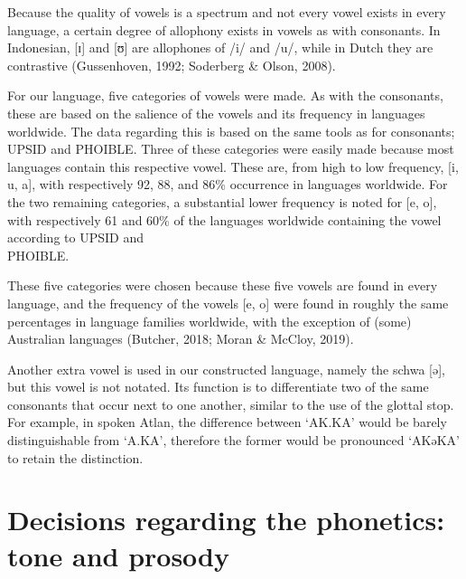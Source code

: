 Because the quality of vowels is a spectrum and not every vowel exists in every language, a certain degree of allophony exists in vowels as with consonants. In Indonesian, [ɪ] and [ʊ] are allophones of /i/ and /u/, while in Dutch they are contrastive (Gussenhoven, 1992; Soderberg \& Olson, 2008). 

For our language, five categories of vowels were made. As with the consonants, these are based on the salience of the vowels and its frequency in languages worldwide. The data regarding this is based on the same tools as for consonants; UPSID and PHOIBLE. Three of these categories were easily made because most languages contain this respective vowel. These are, from high to low frequency, [i, u, a], with respectively 92, 88, and 86\% occurrence in languages worldwide. For the two remaining categories, a substantial lower frequency is noted for [e, o], with respectively 61 and 60\% of the languages worldwide containing the vowel according to UPSID and \\ PHOIBLE. 

These five categories were chosen because these five vowels are found in every language, and the frequency of the vowels [e, o] were found in roughly the same percentages in language families worldwide, with the exception of (some) Australian languages (Butcher, 2018; Moran \& McCloy, 2019). 

Another extra vowel is used in our constructed language, namely the schwa [ə], but this vowel is not notated. Its function is to differentiate two of the same consonants that occur next to one another, similar to the use of the glottal stop. For example, in spoken Atlan, the difference between ‘AK.KA’ would be barely distinguishable from ‘A.KA’, therefore the former would be pronounced ‘AKəKA’ to retain the distinction. 

\section{Decisions regarding the phonetics: tone and prosody}

